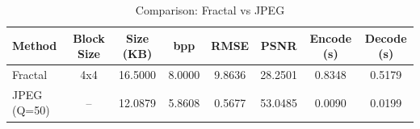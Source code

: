 \begin{table}[h]
\caption{Comparison: Fractal vs JPEG}
\label{tab:compression}
\begin{tabular}{lccccccc}
\toprule
Method & Block Size & Size (KB) & bpp & RMSE & PSNR & Encode (s) & Decode (s) \\
\midrule
Fractal & 4x4 & 16.5000 & 8.0000 & 9.8636 & 28.2501 & 0.8348 & 0.5179 \\
JPEG (Q=50) & -- & 12.0879 & 5.8608 & 0.5677 & 53.0485 & 0.0090 & 0.0199 \\
\bottomrule
\end{tabular}
\end{table}

